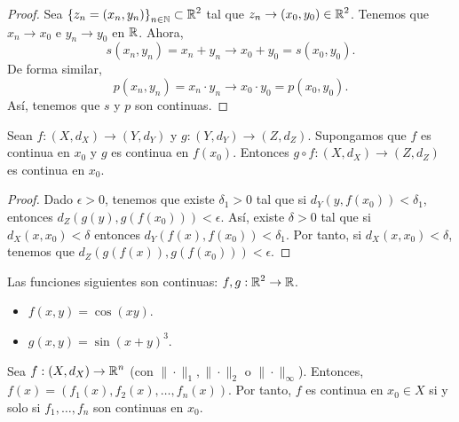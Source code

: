 \begin{proof}
	Sea $\displaystyle \left\{ z_{n} = \left(x_{n},y_{n}\right)\right\} _{n\in\mathbb{N}} \subset \mathbb{R}^{2} $ tal que $\displaystyle z_{n} \to \left(x_{0}, y_{0}\right) \in \mathbb{R}^{2} $. Tenemos que $\displaystyle x_{n} \to x_{0} $ e $\displaystyle y_{n} \to y_{0} $ en $\displaystyle \mathbb{R} $. Ahora, 
	\[s\left(x_{n}, y_{n}\right) = x_{n} +y_{n} \to x_{0} +y_{0} = s\left(x_{0}, y_{0}\right) .\]
	De forma similar, 
	\[p\left(x_{n}, y_{n}\right) = x_{n} \cdot y_{n} \to x_{0} \cdot y_{0} = p\left(x_{0}, y_{0}\right) .\]
Así, tenemos que $\displaystyle s $ y $\displaystyle p $ son continuas.	
\end{proof}
\begin{prop}
Sean $\displaystyle f : \left(X, d _{X}\right) \to \left(Y, d _{Y}\right) $ y $\displaystyle g : \left(Y, d _{Y}\right) \to \left(Z, d _{Z}\right) $. Supongamos que $\displaystyle f $ es continua en $\displaystyle x_{0} $ y $\displaystyle g $ es continua en $\displaystyle f\left(x_{0}\right) $. Entonces $\displaystyle g\circ f : \left(X, d _{X}\right) \to \left(Z, d _{Z}\right) $ es continua en $\displaystyle x_{0} $.
\end{prop}
\begin{proof}
Dado $\displaystyle \epsilon > 0 $, tenemos que existe $\displaystyle \delta _{1} > 0 $ tal que si $\displaystyle d _{Y}\left(y, f\left(x_{0}\right)\right) < \delta _{1} $, entonces $\displaystyle d _{Z}\left(g\left(y\right), g\left(f\left(x_{0}\right)\right)\right) < \epsilon  $. Así, existe $\displaystyle \delta > 0 $ tal que si $\displaystyle d _{X}\left(x,x_{0}\right) < \delta  $ entonces $\displaystyle d _{Y}\left(f\left(x\right), f\left(x_{0}\right)\right) < \delta_{1} $. Por tanto, si $\displaystyle d _{X}\left(x,x_{0}\right) < \delta  $, tenemos que $\displaystyle d _{Z}\left(g\left(f\left(x\right)\right), g\left(f\left(x_{0}\right)\right)\right) < \epsilon  $.
\end{proof}
\begin{eg}
Las funciones siguientes son continuas: $\displaystyle f,g : \mathbb{R}^{2} \to \mathbb{R} $.
\begin{itemize}
\item $\displaystyle f\left(x,y\right) = \cos\left(xy\right) $.
\item $\displaystyle g\left(x,y\right) = \sin\left(x + y\right)^{3} $. 
\end{itemize}
\end{eg}
\begin{prop}
Sea $\displaystyle f : \left(X, d _{X}\right) \to \mathbb{R}^{n} $ (con $\displaystyle \| \cdot \|_{1}, \| \cdot \|_{2} $ o $\displaystyle \| \cdot \|_{\infty} $). Entonces, $\displaystyle f\left(x\right) = \left(f_{1}\left(x\right), f_{2}\left(x\right), \ldots, f_{n}\left(x\right)\right) $. Por tanto, $\displaystyle f $ es continua en $\displaystyle x_{0} \in X $ si y solo si $\displaystyle f_{1}, \ldots, f_{n} $ son continuas en $\displaystyle x_{0} $.
\end{prop}
